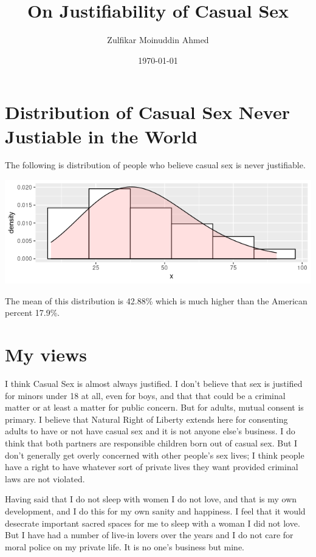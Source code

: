 \documentclass{amsart}
\title{On Justifiability of Casual Sex}
\author{Zulfikar Moinuddin Ahmed}
\date{\today}
\begin{document}
\maketitle
\section{Distribution of Casual Sex Never Justiable in the World}

The following is distribution of people who believe casual sex is never justifiable.

\includegraphics[scale=0.7]{nosex.png}

The mean of this distribution is 42.88\% which is much higher than the American percent 17.9\%.  

\section{My views}
I think Casual Sex is almost always justified.  I don't believe that sex is justified for minors under 18 at all, even for boys, and that that could be a criminal matter or at least a matter for public concern.  But for adults, mutual consent is primary.  I believe that Natural Right of Liberty extends here for consenting adults to have or not have casual sex and it is not anyone else's business.  I do think that both partners are responsible children born out of casual sex.  But I don't generally get overly concerned with other people's sex lives; I think people have a right to have whatever sort of private lives they want provided criminal laws are not violated.

Having said that I do not sleep with women I do not love, and that is my own development, and I do this for my own sanity and happiness.  I feel that it would desecrate important sacred spaces for me to sleep with a woman I did not love.  But I have had a number of live-in lovers over the years and I do not care for moral police on my private life.  It is no one's business but mine.
\end{document}
